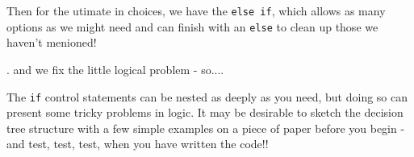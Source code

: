 \documentclass[titlepage]{book}\usepackage{knitr}
\begin{document}
Then for the utimate in choices, we have the \texttt{else if}, which allows as many options as we might need and can finish with an \texttt{else} to clean up those we haven't menioned! 
\begin{knitrout}
\color{fgcolor}\begin{kframe}
\begin{alltt}
 \hlkwb{<-} 
  \hlopt{==} \hlstd{) \{}
  \hlstd{(}\hlstd{)}
\hlstd{\}}   \hlopt{>} \hlstd{)\{}
\hlstd{\}}   \hlopt{<} \hlstd{) \{}
  \hlstd{(}\hlstd{)}
\hlstd{\}}
\end{alltt}
\end{kframe}
\end{knitrout}

.  and we fix the little logical problem - so....
\begin{knitrout}
\color{fgcolor}\begin{kframe}
\begin{alltt}
 \hlkwb{<-} 
  \hlopt{==} \hlstd{) \{}
  \hlstd{(}\hlstd{)}
\hlstd{\}}   \hlopt{>} \hlstd{)\{}
\hlstd{\}}   \hlopt{<} \hlstd{) \{}
  \hlstd{(}\hlstd{)}
\hlstd{\}}  \hlstd{\{}
  \hlstd{(}\hlstd{)}
\hlstd{\}}
\end{alltt}
\end{kframe}
\end{knitrout}

The \texttt{if} control statements can be nested as deeply as you need, but doing so can present some tricky problems in logic.  It may be desirable to sketch the decision tree structure with a few simple examples on a piece of paper before you begin - and test, test, test, when you have written the code!!
\end{document}
